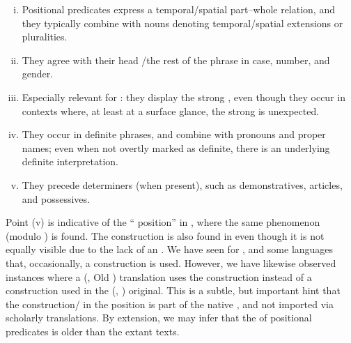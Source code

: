 \documentclass[output=paper,colorlinks,citecolor=brown]{langscibook}
\begin{document}
\begin{enumerate}[(i)]
     \item  Positional predicates express a temporal/spatial part--whole relation, and they typically combine with nouns denoting temporal/spatial extensions or pluralities. 
    \item They agree with their head /the rest of the  phrase  in case, number, and gender.  
    \item Especially relevant for : they display the strong , even though they occur in contexts where, at least at a surface glance, the strong  is unexpected. %
    \item They occur in definite  phrases, and combine with pronouns and proper names;  even when not overtly marked as definite, there is an underlying definite interpretation.   %
    \item They precede determiners (when present), such as demonstratives, articles, and possessives. %
\end{enumerate} 

Point (v) is indicative of the `` position'' in , where the same phenomenon (modulo ) is found. The construction is also found in  even though it is not equally visible due to the lack of an . We have seen for ,  and some  languages that, occasionally, a  construction is used. However, we have likewise observed instances where a (, Old ) translation uses the  construction instead of a  construction used in the (, ) original. This is a subtle, but important hint that the  construction/ in the  position is part of the native  , and not imported via scholarly translations. By extension, we may infer that the  of positional predicates is older than the extant texts.

\end{document}
